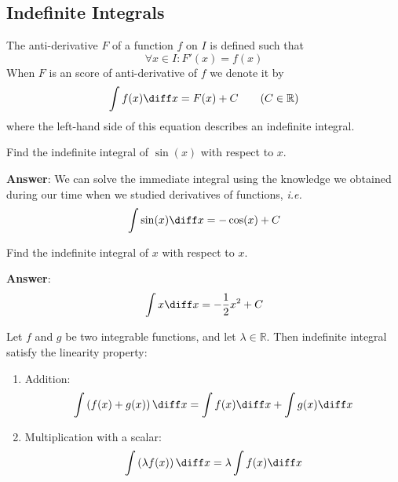 \subsection{Indefinite Integrals}\label{subsec-indefinite-integrals}


\begin{definition}\label{def-indefinite-integral}
	The anti-derivative $F$ of a function $f$ on $I$ is defined such that
	\begin{equation}
		\forall x\in I:  F'(x) = f(x)
	\end{equation}
	When $F$ is an score of anti-derivative of $f$ we denote it by
	\begin{equation}\label{eq-indefinite-integral}
		\int f(x) \diff x = F(x) + C \qquad(C\in\mathbb{R})
	\end{equation}
	where the left-hand side of this equation describes an indefinite integral.
\end{definition}

\begin{exm}\label{exm-indefinite-integral:1}
	Find the indefinite integral of $\sin(x)$ with respect to $x$.
	\begin{flushleft}
		\textbf{Answer}: We can solve the immediate integral using the knowledge
		we obtained during our time when we studied derivatives of functions,
		\textit{i.e.}
		\begin{equation*}
			\int \sin(x) \diff x = -\cos(x) + C
		\end{equation*}
	\end{flushleft}
\end{exm}

\begin{exm}\label{exm-indefinite-integral:2}
	Find the indefinite integral of $x$ with respect to $x$.
	\begin{flushleft}
		\textbf{Answer}:
		\begin{equation*}
			\int x \diff x = -\frac{1}{2}x^2 + C
		\end{equation*}
	\end{flushleft}
\end{exm}

\begin{thm}\label{thm-indefinite-integral-linearity}
	Let $f$ and $g$ be two integrable functions, and let $\lambda\in\mathbb{R}$.
	Then indefinite integral satisfy the linearity property:
	\begin{enumerate}
		\item Addition:
		      \begin{equation}\label{eq-indefinite-integral-linearity:1}
			      \int \left(f(x)+g(x)\right) \diff x = \int f(x) \diff x + \int g(x) \diff x
		      \end{equation}
		\item Multiplication with a scalar:
		      \begin{equation}\label{eq-indefinite-integral-linearity:2}
			      \int \left(\lambda f(x)\right) \diff x = \lambda \int f(x) \diff x
		      \end{equation}
	\end{enumerate}
\end{thm}

